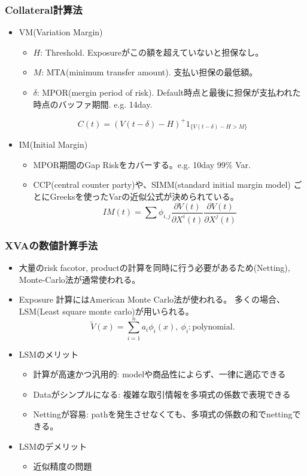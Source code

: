 \documentclass[driverfallback=dvipdfmx,cjk]{beamer}
\begin{document}
\begin{frame}\frametitle{Collateral計算法}
    \begin{itemize}
        \item VM(Variation Margin)
            \begin{itemize}
                \item $H$: Threshold. Exposureがこの額を超えていないと担保なし。
                \item $M$: MTA(minimum transfer amount). 支払い担保の最低額。
                \item $\delta$: MPOR(mergin period of risk). Default時点と最後に担保が支払われた時点のバッファ期間. e.g. 14day.
            \end{itemize}
            $$ C(t) = \left(V(t- \delta) - H\right)^+ 1_{\{V(t-\delta)-H > M\}}$$
        \item IM(Initial Margin)
            \begin{itemize}
                \item MPOR期間のGap Riskをカバーする。e.g. 10day 99\% Var.
                \item CCP(central counter party)や、SIMM(standard initial margin model)
                    ごとにGreeksを使ったVarの近似公式が決められている。
                    $$IM(t) = \sum \phi_{i,j} \frac{\partial V(t)}{\partial X^i(t)} \frac{\partial V(t)}{\partial X^j(t)}$$
            \end{itemize}
    \end{itemize}
\end{frame}

\begin{frame} \frametitle{XVAの数値計算手法}
    \begin{itemize}
        \item 大量のrisk facotor, productの計算を同時に行う必要があるため(Netting), Monte-Carlo法が通常使われる。
        \item Exposure 計算にはAmerican Monte Carlo法が使われる。
            多くの場合、LSM(Least square monte carlo)が用いられる。
            $$ \tilde{V}(x) = \sum_{i=1}^n a_i \phi_i(x), \ \phi_i: \text{polynomial}.$$
        \item LSMのメリット
        \begin{itemize}
            \item 計算が高速かつ汎用的: modelや商品性によらず、一律に適応できる
            \item Dataがシンプルになる: 複雑な取引情報を多項式の係数で表現できる
            \item Nettingが容易: pathを発生させなくても、多項式の係数の和でnettingできる。
        \end{itemize}
    \item LSMのデメリット
        \begin{itemize}
            \item 近似精度の問題
        \end{itemize}
    \end{itemize}
\end{frame}
\end{document}

